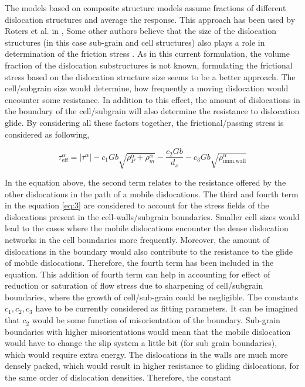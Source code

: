 \documentclass[a4paper,11pt]{article}
\begin{document}
The models based on composite structure models assume fractions of different dislocation structures and average the response. This approach has been used by Roters et al. in \cite{Roters2000}, \cite{Ma2004}
Some other authors believe that the size of the dislocation structures (in this case sub-grain and cell structures) also plays a role in determination of the friction stress \cite{Nes1997}. 
As in this current formulation, the volume fraction of the dislocation substructures is not known, formulating the frictional stress based on the dislocation structure size seems to be a better approach.
The cell/subgrain size would determine, how frequently a moving dislocation would encounter some resistance. In addition to this effect, the amount of dislocations in the boundary of the cell/subgrain will also determine 
the resistance to dislocation glide. By considering all these factors together, the frictional/passing stress is considered as following,

\begin{equation} 
\tau_{\text{eff}}^\alpha = \left|\tau^\alpha\right| - c_1 G b \sqrt{\rho_P^\alpha + \rho_m^\alpha} - \frac{c_2 G b}{d_s} - c_3 G b \sqrt{\rho_{\text{imm,wall}}^\alpha} \label{eq:3}
\end{equation}

In the equation above, the second term relates to the resistance offered by the other dislocations in the path of a mobile dislocations. 
The third and fourth term in the equation \eqref{eq:3} are considered to account for the stress fields of the dislocations present in the cell-walls/subgrain boundaries.
Smaller cell sizes would lead to the cases where the mobile dislocations encounter the dense dislocation networks in the cell boundaries more frequently. 
Moreover, the amount of dislocations in the boundary would also contribute to the resistance to the glide of mobile dislocations. 
Therefore, the fourth term has been included in the equation. 
This addition of fourth term can help in accounting for effect of reduction or saturation of flow stress due to sharpening of cell/subgrain boundaries, where the growth of cell/sub-grain could be negligible. 
The constants \begin{math} c_1,c_2,c_3 \end{math} have to be currently considered as fitting parameters. 
It can be imagined that \begin{math} c_2 \end{math} would be some function of misorientation of the boundary. 
Sub-grain boundaries with higher misorientations would mean that the mobile dislocation would have to change the slip system a little bit (for sub grain boundaries), which would require extra energy.  
The dislocations in the walls are much more densely packed, which would result in higher resistance to gliding dislocations, for the same order of dislocation densities. 
Therefore, the constant 
\end{document}
